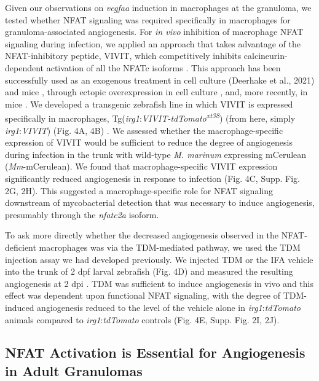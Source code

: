 Given our observations on \textit{vegfaa} induction in macrophages at the granuloma, we tested whether NFAT signaling was required specifically in macrophages for granuloma-associated angiogenesis. For \textit{in vivo} inhibition of macrophage NFAT signaling during infection, we applied an approach that takes advantage of the NFAT-inhibitory peptide, VIVIT, which competitively inhibits calcineurin-dependent activation of all the NFATc isoforms \citep{Aramburu1999}. This approach has been successfully used as an exogenous treatment in cell culture \citep{Deerhake2021} (Deerhake et al., 2021) and mice \citep{Noguchi2004, Elloumi2012, Rojanathammanee2015}, through ectopic overexpression in cell culture \citep{McCullagh2004},  and, more recently, in mice \citep{Poli2022, Peuker2022}. We developed a transgenic zebrafish line in which VIVIT is expressed specifically in macrophages, Tg(\textit{irg1}:\textit{VIVIT-tdTomato\textsuperscript{xt38}}) (from here, simply \textit{irg1}:\textit{VIVIT}) (Fig. 4A, 4B) \citep{Sanderson2015}. We assessed whether the macrophage-specific expression of VIVIT would be sufficient to reduce the degree of angiogenesis during infection in the trunk with wild-type \textit{M. marinum} expressing mCerulean (\textit{Mm}-mCerulean). We found that macrophage-specific VIVIT expression significantly reduced angiogenesis in response to infection (Fig. 4C, Supp. Fig. 2G, 2H). This suggested a macrophage-specific role for NFAT signaling downstream of mycobacterial detection that was necessary to induce angiogenesis, presumably through the \textit{nfatc2a} isoform.

To ask more directly whether the decreased angiogenesis observed in the NFAT-deficient macrophages was via the TDM-mediated pathway, we used the TDM injection assay we had developed previously. We injected TDM or the IFA vehicle  into the trunk of 2 dpf larval zebrafish (Fig. 4D) and measured the resulting angiogenesis at 2 dpi \citep{Walton2018}. TDM was sufficient to induce angiogenesis in vivo and this effect was dependent upon functional NFAT signaling, with the degree of TDM-induced angiogenesis reduced to the level of the vehicle alone in \textit{irg1}:\textit{tdTomato} animals compared to \textit{irg1}:\textit{tdTomato} controls (Fig. 4E, Supp. Fig. 2I, 2J).

\subsection{NFAT Activation is Essential for Angiogenesis in Adult Granulomas}

